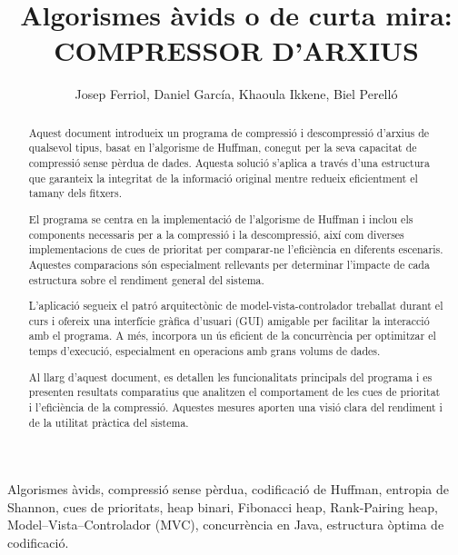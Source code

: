 \documentclass{ieeetj}
\begin{document}
\receiveddate{////}
\publisheddate{/////}
\currentdate{//////}

\title{Algorismes àvids o de curta mira: COMPRESSOR D'ARXIUS}

\author{Josep Ferriol, Daniel García, Khaoula Ikkene, Biel Perelló}  



\begin{abstract} 
Aquest document introdueix un programa de compressió i descompressió d'arxius de qualsevol tipus, basat en l'algorisme de Huffman, conegut per la seva capacitat de compressió sense pèrdua de dades. Aquesta solució s'aplica a través d'una estructura que garanteix la integritat de la informació original mentre redueix eficientment el tamany dels fitxers.

El programa se centra en la implementació de l'algorisme de Huffman i inclou els components necessaris per a la compressió i la descompressió, així com diverses implementacions de cues de prioritat per comparar-ne l'eficiència en diferents escenaris. Aquestes comparacions són especialment rellevants per determinar l'impacte de cada estructura sobre el rendiment general del sistema.\newline

L'aplicació segueix el patró arquitectònic de model-vista-controlador treballat durant el curs i ofereix una interfície gràfica d'usuari (GUI) amigable per facilitar la interacció amb el programa. A més, incorpora un ús eficient de la concurrència per optimitzar el temps d'execució, especialment en operacions amb grans volums de dades.

Al llarg d'aquest document, es detallen les funcionalitats principals del programa i es presenten resultats comparatius que analitzen el comportament de les cues de prioritat i l'eficiència de la compressió. Aquestes mesures aporten una visió clara del rendiment i de la utilitat pràctica del sistema.
\end{abstract}

\begin{IEEEkeywords}
Algorismes àvids, compressió sense pèrdua, codificació de Huffman, entropia de Shannon, cues de prioritats, heap binari, Fibonacci heap, Rank-Pairing heap, Model–Vista–Controlador (MVC), concurrència en Java, estructura òptima de codificació.
\end{IEEEkeywords}
\end{document}
